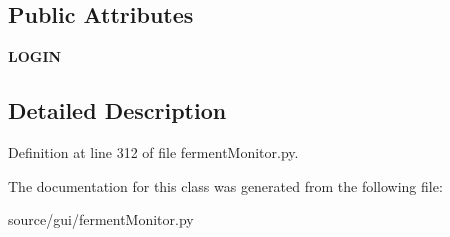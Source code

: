 \subsection*{Public Attributes}
\begin{DoxyCompactItemize}
\item 
\mbox{\label{classferment_monitor_1_1_ferment_monitor_thread_a9b739a0b4bc08a636e1211c7ebcdaff6}} 
{\bfseries L\+O\+G\+IN}
\end{DoxyCompactItemize}


\subsection{Detailed Description}


Definition at line 312 of file ferment\+Monitor.\+py.



The documentation for this class was generated from the following file\+:\begin{DoxyCompactItemize}
\item 
source/gui/ferment\+Monitor.\+py\end{DoxyCompactItemize}
